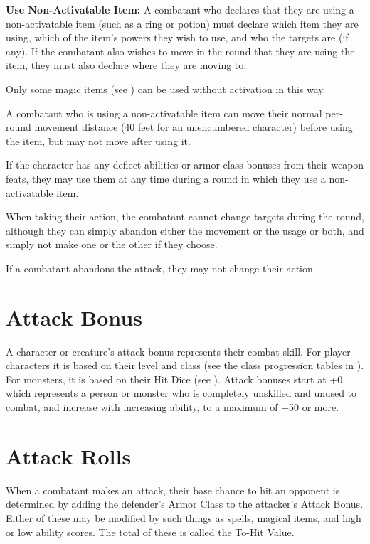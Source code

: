 \begin{multicols*}{2}
\textbf{Use Non-Activatable Item:} A combatant who declares that they are using a non-activatable item (such as a ring or potion) must declare which item they are using, which of the item’s powers they wish to use, and who the targets are (if any). If the combatant also wishes to move in the round that they are using the item, they must also declare where they are moving to.

Only some magic items (see ) can be used without activation in this way.

A combatant who is using a non-activatable item can move their normal per-round movement distance (40 feet for an unencumbered character) before using the item, but may not move after using it.

If the character has any deflect abilities or armor class bonuses from their weapon feats, they may use them at any time during a round in which they use a non-activatable item.

When taking their action, the combatant cannot change targets during the round, although they can simply abandon either the movement or the usage or both, and simply not make one or the other if they choose.

If a combatant abandons the attack, they may not change their action.

\section{Attack Bonus}\label{sec:Attack Bonus}
A character or creature’s attack bonus represents their combat skill. For player characters it is based on their level and class (see the class progression tables in ). For monsters, it is based on their Hit Dice (see ). Attack bonuses start at +0, which represents a person or monster who is completely unskilled and unused to combat, and increase with increasing ability, to a maximum of +50 or more.

\section{Attack Rolls}
When a combatant makes an attack, their base chance to hit an opponent is determined by adding the defender’s Armor Class to the attacker’s Attack Bonus. Either of these may be modified by such things as spells, magical items, and high or low ability scores. The total of these is called the To-Hit Value.


\end{multicols*}
